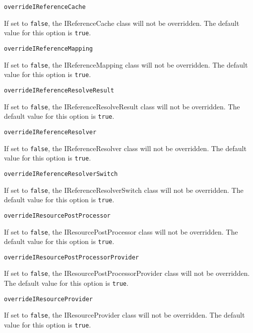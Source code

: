 \noindent\texttt{overrideIReferenceCache}
\begin{myindentpar}{1cm}
If set to \texttt{false}, the IReferenceCache class will not be overridden. The default value for this option is \texttt{true}.
\end{myindentpar}

\noindent\texttt{overrideIReferenceMapping}
\begin{myindentpar}{1cm}
If set to \texttt{false}, the IReferenceMapping class will not be overridden. The default value for this option is \texttt{true}.
\end{myindentpar}

\noindent\texttt{overrideIReferenceResolveResult}
\begin{myindentpar}{1cm}
If set to \texttt{false}, the IReferenceResolveResult class will not be overridden. The default value for this option is \texttt{true}.
\end{myindentpar}

\noindent\texttt{overrideIReferenceResolver}
\begin{myindentpar}{1cm}
If set to \texttt{false}, the IReferenceResolver class will not be overridden. The default value for this option is \texttt{true}.
\end{myindentpar}

\noindent\texttt{overrideIReferenceResolverSwitch}
\begin{myindentpar}{1cm}
If set to \texttt{false}, the IReferenceResolverSwitch class will not be overridden. The default value for this option is \texttt{true}.
\end{myindentpar}

\noindent\texttt{overrideIResourcePostProcessor}
\begin{myindentpar}{1cm}
If set to \texttt{false}, the IResourcePostProcessor class will not be overridden. The default value for this option is \texttt{true}.
\end{myindentpar}

\noindent\texttt{overrideIResourcePostProcessorProvider}
\begin{myindentpar}{1cm}
If set to \texttt{false}, the IResourcePostProcessorProvider class will not be overridden. The default value for this option is \texttt{true}.
\end{myindentpar}

\noindent\texttt{overrideIResourceProvider}
\begin{myindentpar}{1cm}
If set to \texttt{false}, the IResourceProvider class will not be overridden. The default value for this option is \texttt{true}.
\end{myindentpar}

